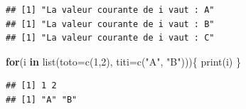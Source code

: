 \documentclass[
  11pt,
]{book}
\newenvironment{Shaded}{\begin{snugshade}}{\end{snugshade}}
\newcommand{\AttributeTok}[1]{\textcolor[rgb]{0.77,0.63,0.00}{#1}}
\newcommand{\ControlFlowTok}[1]{\textcolor[rgb]{0.13,0.29,0.53}{\textbf{#1}}}
\newcommand{\DecValTok}[1]{\textcolor[rgb]{0.00,0.00,0.81}{#1}}
\newcommand{\FunctionTok}[1]{\textcolor[rgb]{0.00,0.00,0.00}{#1}}
\newcommand{\NormalTok}[1]{#1}
\newcommand{\StringTok}[1]{\textcolor[rgb]{0.31,0.60,0.02}{#1}}
\numberwithin{equation}{section}
\numberwithin{countremarque}{section}
\begin{document}
\begin{lstlisting}
## [1] "La valeur courante de i vaut : A"
## [1] "La valeur courante de i vaut : B"
## [1] "La valeur courante de i vaut : C"
\end{lstlisting}

\begin{Shaded}
\begin{Highlighting}[]
\ControlFlowTok{for}\NormalTok{(i }\ControlFlowTok{in} \FunctionTok{list}\NormalTok{(}\AttributeTok{toto=}\FunctionTok{c}\NormalTok{(}\DecValTok{1}\NormalTok{,}\DecValTok{2}\NormalTok{), }\AttributeTok{titi=}\FunctionTok{c}\NormalTok{(}\StringTok{"A"}\NormalTok{, }\StringTok{"B"}\NormalTok{)))\{}
  \FunctionTok{print}\NormalTok{(i)}
\NormalTok{\}}
\end{Highlighting}
\end{Shaded}

\begin{lstlisting}
## [1] 1 2
## [1] "A" "B"
\end{lstlisting}
\end{document}
